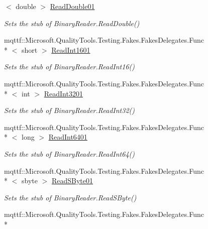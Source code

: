 \begin{DoxyCompactItemize}
$<$ double $>$ \hyperlink{class_system_1_1_i_o_1_1_fakes_1_1_stub_binary_reader_a2a788e60599817ff466a6916cd5664e6}{Read\-Double01}
\begin{DoxyCompactList}\small\item\em Sets the stub of Binary\-Reader.\-Read\-Double()\end{DoxyCompactList}\item 
mqttf\-::\-Microsoft.\-Quality\-Tools.\-Testing.\-Fakes.\-Fakes\-Delegates.\-Func\\*
$<$ short $>$ \hyperlink{class_system_1_1_i_o_1_1_fakes_1_1_stub_binary_reader_acae8435f0c3a13da2e9a5a8a580cf766}{Read\-Int1601}
\begin{DoxyCompactList}\small\item\em Sets the stub of Binary\-Reader.\-Read\-Int16()\end{DoxyCompactList}\item 
mqttf\-::\-Microsoft.\-Quality\-Tools.\-Testing.\-Fakes.\-Fakes\-Delegates.\-Func\\*
$<$ int $>$ \hyperlink{class_system_1_1_i_o_1_1_fakes_1_1_stub_binary_reader_a359899dc55cbdba201b085d93698b2ac}{Read\-Int3201}
\begin{DoxyCompactList}\small\item\em Sets the stub of Binary\-Reader.\-Read\-Int32()\end{DoxyCompactList}\item 
mqttf\-::\-Microsoft.\-Quality\-Tools.\-Testing.\-Fakes.\-Fakes\-Delegates.\-Func\\*
$<$ long $>$ \hyperlink{class_system_1_1_i_o_1_1_fakes_1_1_stub_binary_reader_ae25500a0900642ac759b76bc75e7ce7b}{Read\-Int6401}
\begin{DoxyCompactList}\small\item\em Sets the stub of Binary\-Reader.\-Read\-Int64()\end{DoxyCompactList}\item 
mqttf\-::\-Microsoft.\-Quality\-Tools.\-Testing.\-Fakes.\-Fakes\-Delegates.\-Func\\*
$<$ sbyte $>$ \hyperlink{class_system_1_1_i_o_1_1_fakes_1_1_stub_binary_reader_a679debed6101eae1fdc501f1d38d77cb}{Read\-S\-Byte01}
\begin{DoxyCompactList}\small\item\em Sets the stub of Binary\-Reader.\-Read\-S\-Byte()\end{DoxyCompactList}\item 
mqttf\-::\-Microsoft.\-Quality\-Tools.\-Testing.\-Fakes.\-Fakes\-Delegates.\-Func\\*

\end{DoxyCompactItemize}
